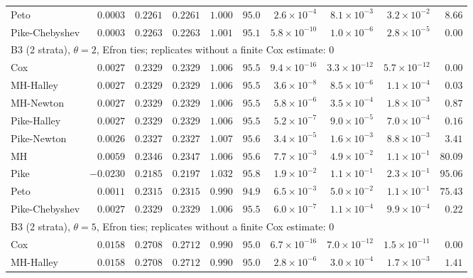 \begin{landscape}
\begin{longtable}{lrrrrrrrrr}
Peto & $0.0003$ & $0.2261$ & $0.2261$ & $1.000$ & $95.0$ & $2.6 \times 10^{-4}$ & $8.1 \times 10^{-3}$ & $3.2 \times 10^{-2}$ & $8.66$ \\
Pike-Chebyshev & $0.0003$ & $0.2263$ & $0.2263$ & $1.001$ & $95.1$ & $5.8 \times 10^{-10}$ & $1.0 \times 10^{-6}$ & $2.8 \times 10^{-5}$ & $0.00$ \\
\multicolumn{10}{l}{B3 (2 strata), $\theta = 2$, Efron ties; replicates without a finite Cox estimate: 0} \\
Cox & $0.0027$ & $0.2329$ & $0.2329$ & $1.006$ & $95.5$ & $9.4 \times 10^{-16}$ & $3.3 \times 10^{-12}$ & $5.7 \times 10^{-12}$ & $0.00$ \\
MH-Halley & $0.0027$ & $0.2329$ & $0.2329$ & $1.006$ & $95.5$ & $3.6 \times 10^{-8}$ & $8.5 \times 10^{-6}$ & $1.1 \times 10^{-4}$ & $0.03$ \\
MH-Newton & $0.0027$ & $0.2329$ & $0.2329$ & $1.006$ & $95.5$ & $5.8 \times 10^{-6}$ & $3.5 \times 10^{-4}$ & $1.8 \times 10^{-3}$ & $0.87$ \\
Pike-Halley & $0.0027$ & $0.2329$ & $0.2329$ & $1.006$ & $95.5$ & $5.2 \times 10^{-7}$ & $9.0 \times 10^{-5}$ & $7.0 \times 10^{-4}$ & $0.16$ \\
Pike-Newton & $0.0026$ & $0.2327$ & $0.2327$ & $1.007$ & $95.6$ & $3.4 \times 10^{-5}$ & $1.6 \times 10^{-3}$ & $8.8 \times 10^{-3}$ & $3.41$ \\
MH & $0.0059$ & $0.2346$ & $0.2347$ & $1.006$ & $95.6$ & $7.7 \times 10^{-3}$ & $4.9 \times 10^{-2}$ & $1.1 \times 10^{-1}$ & $80.09$ \\
Pike & $-0.0230$ & $0.2185$ & $0.2197$ & $1.032$ & $95.8$ & $1.9 \times 10^{-2}$ & $1.1 \times 10^{-1}$ & $2.3 \times 10^{-1}$ & $95.06$ \\
Peto & $0.0011$ & $0.2315$ & $0.2315$ & $0.990$ & $94.9$ & $6.5 \times 10^{-3}$ & $5.0 \times 10^{-2}$ & $1.1 \times 10^{-1}$ & $75.43$ \\
Pike-Chebyshev & $0.0027$ & $0.2329$ & $0.2329$ & $1.006$ & $95.5$ & $6.0 \times 10^{-7}$ & $1.1 \times 10^{-4}$ & $9.9 \times 10^{-4}$ & $0.22$ \\
\multicolumn{10}{l}{B3 (2 strata), $\theta = 5$, Efron ties; replicates without a finite Cox estimate: 0} \\
Cox & $0.0158$ & $0.2708$ & $0.2712$ & $0.990$ & $95.0$ & $6.7 \times 10^{-16}$ & $7.0 \times 10^{-12}$ & $1.5 \times 10^{-11}$ & $0.00$ \\
MH-Halley & $0.0158$ & $0.2708$ & $0.2712$ & $0.990$ & $95.0$ & $2.8 \times 10^{-6}$ & $3.0 \times 10^{-4}$ & $1.7 \times 10^{-3}$ & $1.41$ \\

\end{longtable}
\end{landscape}
